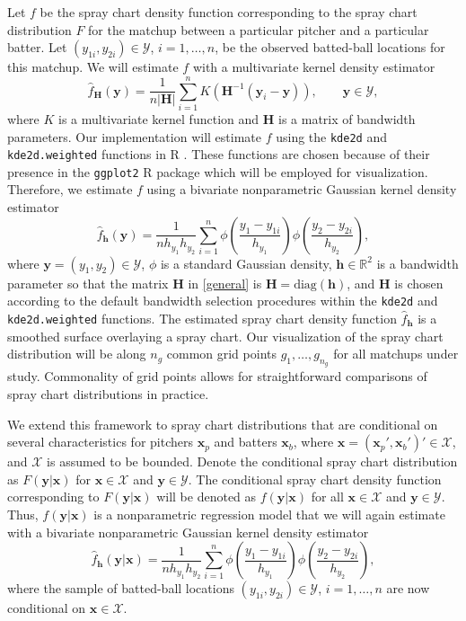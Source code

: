 \documentclass[12pt]{article}
\newcommand{\R}{\mathbb{R}}
\newcommand{\Y}{\mathcal{Y}}
\newcommand{\X}{\mathcal{X}}
\newcommand{\Hbf}{\textbf{H}}
\newcommand{\y}{\textbf{y}}
\newcommand{\x}{\textbf{x}}
\newcommand{\h}{\textbf{h}}
\begin{document}
Let $f$ be the spray chart density function corresponding to the spray chart distribution $F$ for the matchup between a particular pitcher and a particular batter. Let $(y_{1i},y_{2i}) \in \Y$, $i = 1, \ldots, n$, be the observed batted-ball locations for this matchup. We will estimate $f$ with a multivariate kernel density estimator
\begin{equation} \label{general}
  \hat f_\Hbf(\y) = \frac{1}{n|\Hbf|}\sum_{i=1}^{n} K\left(\Hbf^{-1}(\y_i - \y)\right), 
  \qquad \y \in \Y, 
\end{equation}
where $K$ is a multivariate kernel function and $\Hbf$ is a matrix of bandwidth parameters. Our implementation will estimate $f$ using the \texttt{kde2d} and \texttt{kde2d.weighted} functions in R \citep{MASS, ggtern}. These functions are chosen because of their presence in the \texttt{ggplot2} R package \citep{ggplot2} which will be employed for visualization. Therefore, we estimate $f$ using a bivariate nonparametric Gaussian kernel density estimator
\begin{equation} \label{spraydens}
  \hat f_\h(\y) = 
    \frac{1}{n h_{y_1}h_{y_2}}\sum_{i=1}^{n} \phi\left(\frac{y_1 - y_{1i}}{h_{y_1}}\right)
      \phi\left(\frac{y_2 - y_{2i}}{h_{y_2}}\right),
\end{equation}
where $\y = (y_1, y_2) \in \Y$, $\phi$ is a standard Gaussian density, $\h \in \R^2$ is a bandwidth parameter so that the matrix $\Hbf$ in \eqref{general} is $\Hbf = \text{diag}(\h)$, and $\Hbf$ is chosen according to the default bandwidth selection procedures within the \texttt{kde2d} and \texttt{kde2d.weighted} functions. The estimated spray chart density function $\hat f_\h$ is a smoothed surface overlaying a spray chart. Our visualization of the spray chart distribution will be along $n_g$ common grid points $g_1,\ldots,g_{n_g}$ for all matchups under study. Commonality of grid points allows for straightforward comparisons of spray chart distributions in practice.




We extend this framework to spray chart distributions that are conditional on several characteristics for pitchers $\x_p$ and batters $\x_b$, where $\x = (\x_p',\x_b')' \in \X$, and $\X$ is assumed to be bounded. Denote the conditional spray chart distribution as $F(\y|\x)$ for $\x \in \X$ and $\y \in \Y$. The conditional spray chart density function corresponding to $F(\y|\x)$ will be denoted as $f(\y|\x)$ for all $\x \in \X$ and $\y \in \Y$. Thus, $f(\y|\x)$ is a nonparametric regression model that we will again estimate with a bivariate nonparametric Gaussian kernel density estimator
\begin{equation} \label{spraydens-cov}
  \hat f_\h(\y|\x) = 
    \frac{1}{n h_{y_1}h_{y_2}}\sum_{i=1}^{n} \phi\left(\frac{y_1 - y_{1i}}{h_{y_1}}\right)
      \phi\left(\frac{y_2 - y_{2i}}{h_{y_2}}\right),
\end{equation}
where the sample of batted-ball locations $(y_{1i},y_{2i}) \in \Y$, $i = 1, \ldots, n$ are now conditional on $\x \in \X$.
\end{document}
